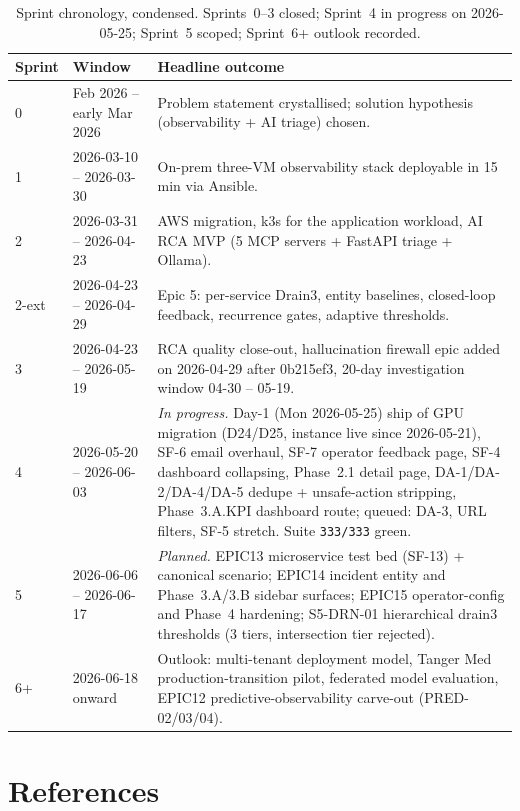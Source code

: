 \documentclass[11pt,a4paper,oneside]{report}
\begin{document}
\begin{table}[h]
\centering
\small
\begin{tabular}{p{} p{} p{}}
\toprule
\textbf{Sprint} & \textbf{Window} & \textbf{Headline outcome} \\
\midrule
0 & Feb 2026 -- early Mar 2026 & Problem statement crystallised; solution
hypothesis (observability + AI triage) chosen. \\
1 & 2026-03-10 -- 2026-03-30 & On-prem three-VM observability stack
deployable in 15\,min via Ansible. \\
2 & 2026-03-31 -- 2026-04-23 & AWS migration, k3s for the application
workload, AI RCA MVP (5 MCP servers + FastAPI triage + Ollama). \\
2-ext & 2026-04-23 -- 2026-04-29 & Epic 5: per-service Drain3,
entity baselines, closed-loop feedback, recurrence gates, adaptive
thresholds. \\
3 & 2026-04-23 -- 2026-05-19 & RCA quality close-out, hallucination
firewall epic added on 2026-04-29 after 0b215ef3, 20-day investigation
window 04-30 -- 05-19. \\
4 & 2026-05-20 -- 2026-06-03 & \emph{In progress.}  Day-1
(Mon 2026-05-25) ship of GPU migration (D24/D25, instance live
since 2026-05-21), SF-6 email overhaul, SF-7 operator
feedback page, SF-4 dashboard collapsing, Phase~2.1 detail page,
DA-1/DA-2/DA-4/DA-5 dedupe + unsafe-action stripping,
Phase~3.A.KPI dashboard route; queued: DA-3, URL filters, SF-5
stretch.  Suite \texttt{333/333} green. \\
5 & 2026-06-06 -- 2026-06-17 & \emph{Planned.}  EPIC13 microservice
test bed (SF-13) + canonical scenario; EPIC14 incident entity and
Phase~3.A/3.B sidebar surfaces; EPIC15 operator-config and
Phase~4 hardening; S5-DRN-01 hierarchical drain3 thresholds (3
tiers, intersection tier rejected). \\
6+ & 2026-06-18 onward & Outlook: multi-tenant deployment model,
Tanger Med production-transition pilot, federated model
evaluation, EPIC12 predictive-observability carve-out
(PRED-02/03/04). \\
\bottomrule
\end{tabular}
\caption{Sprint chronology, condensed.  Sprints~0--3 closed;
Sprint~4 in progress on 2026-05-25; Sprint~5 scoped; Sprint~6+
outlook recorded.}
\label{tab:sprint-summary}
\end{table}

\chapter*{References}
\end{document}

